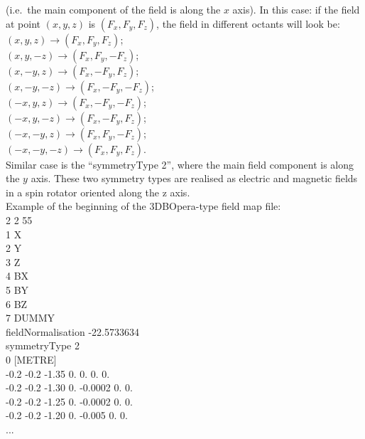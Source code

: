\documentclass[twoside]{dis04}
\begin{document}
\begin{description}
\begin{itemize}
			(i.e.\ the main component of the field is along the $x$ axis).
			In this case:  if the field at point $(x,y,z)$ is $(F_x,F_y,F_z)$, the field in
			different octants will look be: \\
			$(x,y,z) \rightarrow (F_x,F_y,F_z)$;\\
			$(x,y,-z) \rightarrow (F_x,F_y,-F_z)$;\\
			$(x,-y,z) \rightarrow (F_x,-F_y,F_z)$;\\
			$(x,-y,-z) \rightarrow (F_x,-F_y,-F_z)$;\\
			$(-x,y,z) \rightarrow (F_x,-F_y,-F_z)$;\\
			$(-x,y,-z) \rightarrow (F_x,-F_y,F_z)$;\\
			$(-x,-y,z) \rightarrow (F_x,F_y,-F_z)$;\\
			$(-x,-y,-z) \rightarrow (F_x,F_y,F_z)$. \\
			Similar case is the ``symmetryType 2'', where the main field component is along the
			$y$ axis.
			These two symmetry types are realised as electric and magnetic fields 
			in a spin rotator oriented along the z axis.\\
			Example of the beginning of the 3DBOpera-type field map file:\\
			2   2   55\\
			1 X\\
			2 Y\\
			3 Z\\
			4 BX\\
			5 BY\\
			6 BZ\\
			7 DUMMY\\
			fieldNormalisation -22.5733634\\
			symmetryType 2\\
			0 [METRE]\\
			-0.2  -0.2  -1.35  0.  0.     0. 0.\\
			-0.2  -0.2  -1.30  0. -0.0002 0. 0.\\
			-0.2  -0.2  -1.25  0. -0.0002 0. 0.\\
			-0.2  -0.2  -1.20  0. -0.005  0. 0.\\
			...\\
			

\end{itemize}
\end{description}
\end{document}

